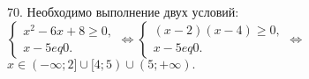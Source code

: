 70. Необходимо выполнение двух условий: $\begin{cases} x^2-6x+8\geqslant0,\\ x-5
eq0.\end{cases}\Leftrightarrow
\begin{cases} (x-2)(x-4)\geqslant0,\\ x-5
eq0.\end{cases}
\Leftrightarrow$\\$ x\in (-\infty;2]\cup[4;5)\cup(5;+\infty).$\\
